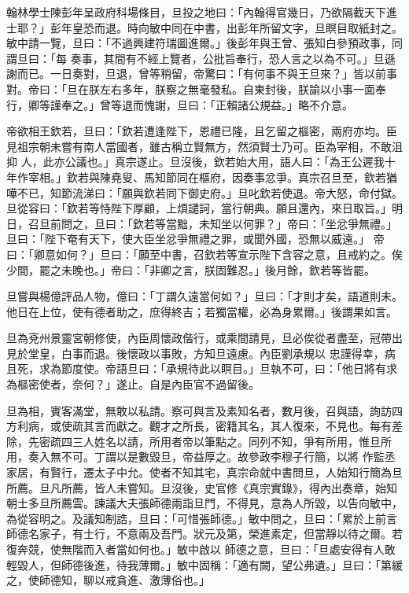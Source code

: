 \begin{pinyinscope}
 翰林學士陳彭年呈政府科場條目，旦投之地曰：「內翰得官幾日，乃欲隔截天下進士耶？」彭年皇恐而退。時向敏中同在中書，出彭年所留文字，旦瞑目取紙封之。敏中請一覽，旦曰：「不過興建符瑞圖進爾。」後彭年與王曾、張知白參預政事，同謂旦曰：「每
 奏事，其間有不經上覽者，公批旨奉行，恐人言之以為不可。」旦遜謝而已。一日奏對，旦退，曾等稍留，帝驚曰：「有何事不與王旦來？」皆以前事對。帝曰：「旦在朕左右多年，朕察之無毫發私。自東封後，朕諭以小事一面奉行，卿等謹奉之。」曾等退而愧謝，旦曰：「正賴諸公規益。」略不介意。



 帝欲相王欽若，旦曰：「欽若遭逢陛下，恩禮已隆，且乞留之樞密，兩府亦均。臣見祖宗朝未嘗有南人當國者，雖古稱立賢無方，然須賢士乃可。臣為宰相，不敢沮抑
 人，此亦公議也。」真宗遂止。旦沒後，欽若始大用，語人曰：「為王公遲我十年作宰相。」欽若與陳堯叟、馬知節同在樞府，因奏事忿爭。真宗召旦至，欽若猶嘩不已，知節流涕曰：「願與欽若同下御史府。」旦叱欽若使退。帝大怒，命付獄。旦從容曰：「欽若等恃陛下厚顧，上煩譴訶，當行朝典。願且還內，來日取旨。」明日，召旦前問之，旦曰：「欽若等當黜，未知坐以何罪？」帝曰：「坐忿爭無禮。」旦曰：「陛下奄有天下，使大臣坐忿爭無禮之罪，或聞外國，恐無以威遠。」
 帝曰：「卿意如何？」旦曰：「願至中書，召欽若等宣示陛下含容之意，且戒約之。俟少間，罷之未晚也。」帝曰：「非卿之言，朕固難忍。」後月餘，欽若等皆罷。



 旦嘗與楊億評品人物，億曰：「丁謂久遠當何如？」旦曰：「才則才矣，語道則未。他日在上位，使有德者助之，庶得終吉；若獨當權，必為身累爾。」後謂果如言。



 旦為兗州景靈宮朝修使，內臣周懷政偕行，或乘間請見，旦必俟從者盡至，冠帶出見於堂皇，白事而退。後懷政以事敗，方知旦遠慮。內臣劉承規以
 忠謹得幸，病且死，求為節度使。帝語旦曰：「承規待此以瞑目。」旦執不可，曰：「他日將有求為樞密使者，奈何？」遂止。自是內臣官不過留後。



 旦為相，賓客滿堂，無敢以私請。察可與言及素知名者，數月後，召與語，詢訪四方利病，或使疏其言而獻之。觀才之所長，密籍其名，其人復來，不見也。每有差除，先密疏四三人姓名以請，所用者帝以筆點之。同列不知，爭有所用，惟旦所用，奏入無不可。丁謂以是數毀旦，帝益厚之。故參政李穆子行簡，以將
 作監丞家居，有賢行，遷太子中允。使者不知其宅，真宗命就中書問旦，人始知行簡為旦所薦。旦凡所薦，皆人未嘗知。旦沒後，史官修《真宗實錄》，得內出奏章，始知朝士多旦所薦雲。諫議大夫張師德兩詣旦門，不得見，意為人所毀，以告向敏中，為從容明之。及議知制誥，旦曰：「可惜張師德。」敏中問之，旦曰：「累於上前言師德名家子，有士行，不意兩及吾門。狀元及第，榮進素定，但當靜以待之爾。若復奔競，使無階而入者當如何也。」敏中啟以
 師德之意，旦曰：「旦處安得有人敢輕毀人，但師德後進，待我薄爾。」敏中固稱：「適有闕，望公弗遺。」旦曰：「第緩之，使師德知，聊以戒貪進、激薄俗也。」




\end{pinyinscope}

